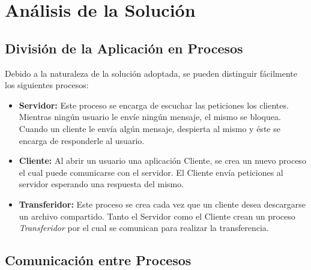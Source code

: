 \documentclass[a4paper,10pt]{article}
\begin{document}
	\section{An\'alisis de la Soluci\'on}
		\subsection{Divisi\'on de la Aplicaci\'on en Procesos}
			Debido a la naturaleza de la soluci\'on adoptada, se pueden distinguir f\'acilmente los siguientes procesos:

			\begin{itemize}
				\item \textbf{Servidor:} Este proceso se encarga de escuchar las peticiones los clientes. Mientras ning\'un usuario le env\'ie ning\'un 
				mensaje, el mismo se bloquea. Cuando un cliente le env\'ia alg\'un mensaje, despierta al mismo y \'este se encarga de responderle al 
				usuario.
				\item \textbf{Cliente:} Al abrir un usuario una aplicaci\'on Cliente, se crea un nuevo proceso el cual puede comunicarse con el servidor.
				El Cliente env\'ia peticiones al servidor esperando una respuesta del mismo.
				\item \textbf{Transferidor:} Este proceso se crea cada vez que un cliente desea descargarse un archivo compartido. Tanto el Servidor como
				el Cliente crean un proceso \emph{Transferidor} por el cual se comunican para realizar la transferencia.
			\end{itemize}

		\subsection{Comunicaci\'on entre Procesos}
\end{document}
